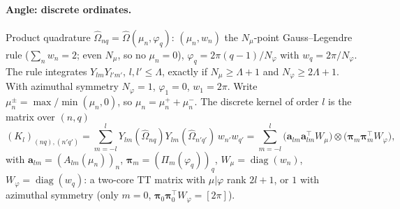 \documentclass[11pt,a4paper]{article}
\newcommand{\Om}{\hat{\Omega}}
\newcommand{\kron}{\otimes}
\newcommand{\Lmax}{\Lambda}
\newcommand{\diag}{\operatorname{diag}}
\begin{document}
\paragraph{Angle: discrete ordinates.} Product quadrature $\Om_{nq}=\Om(\mu_n,\varphi_q)$: $(\mu_n,w_n)$ the $N_\mu$-point Gauss--Legendre rule ($\sum_nw_n=2$; even $N_\mu$, so no $\mu_n=0$), $\varphi_q=2\pi(q-1)/N_\varphi$ with $w_q=2\pi/N_\varphi$. The rule integrates $Y_{lm}Y_{l'm'}$, $l,l'\le\Lmax$, exactly if $N_\mu\ge\Lmax+1$ and $N_\varphi\ge2\Lmax+1$. With azimuthal symmetry $N_\varphi=1$, $\varphi_1=0$, $w_1=2\pi$. Write $\mu_n^\pm=\max/\min(\mu_n,0)$, so $\mu_n=\mu^+_n+\mu^-_n$. The discrete kernel of order $l$ is the matrix over $(n,q)$
\begin{equation}
(K_l)_{(nq),(n'q')}=\sum_{m=-l}^{l}Y_{lm}(\Om_{nq})Y_{lm}(\Om_{n'q'})\,w_{n'}w_{q'}
=\sum_{m=-l}^{l}\big(\bm a_{lm}\bm a_{lm}^{\!\top}W_\mu\big)\kron\big(\bm\pi_m\bm\pi_m^{\!\top}W_\varphi\big),
\label{eq:Kl}
\end{equation}
with $\bm a_{lm}=(A_{lm}(\mu_n))_n$, $\bm\pi_m=(\Pi_m(\varphi_q))_q$, $W_\mu=\diag(w_n)$, $W_\varphi=\diag(w_q)$: a two-core TT matrix with $\mu|\varphi$ rank $2l+1$, or $1$ with azimuthal symmetry (only $m=0$, $\bm\pi_0\bm\pi_0^{\!\top}W_\varphi=[2\pi]$).
\end{document}

